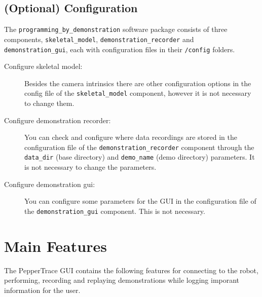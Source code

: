 \documentclass{CSSRforAfrica}
\begin{document}
\newpage

\subsection{(Optional) Configuration}
The \texttt{programming\_by\_demonstration} software package consists of three components, \texttt{skeletal\_model}, \texttt{demonstration\_recorder} and \texttt{demonstration\_gui}, each with configuration files in their \texttt{/config} folders. 

\begin{description}
    
    \item[Configure skeletal model:] Besides the camera intrinsics there are other configuration options in the config file of the \texttt{skeletal\_model} component, however it is not necessary to change them. 
        
    \item[Configure demonstration recorder: ] You can check and  configure where data recordings are stored in the configuration file of the \texttt{demonstration\_recorder} component through the \texttt{data\_dir} (base directory) and \texttt{demo\_name} (demo directory) parameters. It is not necessary to change the parameters.

    \item[Configure demonstration gui: ] You can configure some parameters for the GUI in the configuration file of the \texttt{demonstration\_gui} component. This is not necessary. 
       
    
\end{description}



\newpage

\section{Main Features}

The PepperTrace GUI contains the following features for connecting to the robot, performing, recording and replaying demonstrations while logging imporant information for the user. 
\end{document}

